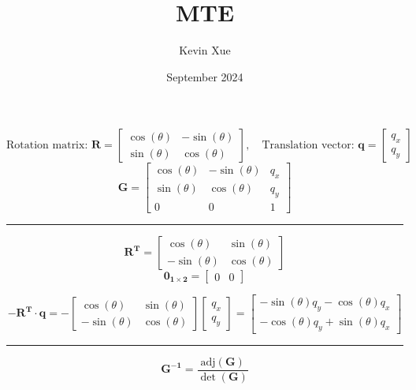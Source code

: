 \documentclass{article}
\title{MTE}
\author{Kevin Xue}
\date{September 2024}
\begin{document}
\maketitle

\section{}
\[
\text{Rotation matrix: }
\bm{\mathbf{R}} = \begin{bmatrix}
\cos(\theta) & -\sin(\theta) \\
\sin(\theta) & \cos(\theta)
\end{bmatrix},
\quad
\text{Translation vector: }
\bm{\mathbf{q}} = \begin{bmatrix}
q_x \\
q_y
\end{bmatrix}
\]
\[
\bm{\mathbf{G}} = \begin{bmatrix}
\cos(\theta) & -\sin(\theta) & q_x \\
\sin(\theta) & \cos(\theta)  & q_y \\
0            & 0             & 1
\end{bmatrix}
\]
\rule{\linewidth}{0.2mm}

\begin{equation}
\bm{\mathbf{R^T}} = \begin{bmatrix}
\cos(\theta) & \sin(\theta) \\
-\sin(\theta) & \cos(\theta)
\end{bmatrix}
\end{equation}
\quad
\begin{equation}
\bm{\mathbf{0}_{1 \times 2}} = \begin{bmatrix}
0 & 0
\end{bmatrix}
\end{equation}

\begin{equation}
-\bm{\mathbf{R^T}} \cdot \bm{\mathbf{q}} = -\begin{bmatrix}
\cos(\theta) & \sin(\theta) \\ -\sin(\theta) & \cos(\theta)
\end{bmatrix} \begin{bmatrix}
q_x \\ q_y
\end{bmatrix}
= \begin{bmatrix}
- \sin(\theta)q_y - \cos(\theta)q_x  \\ -\cos(\theta)q_y + \sin(\theta)q_x 
\end{bmatrix}
\end{equation}
\rule{\linewidth}{0.2mm}
\[
\bm{\mathbf{G^{-1}}} = \frac{\text{adj}(\bm{\mathbf{G}})}{\det(\bm{\mathbf{G}})}
\]
\end{document}
